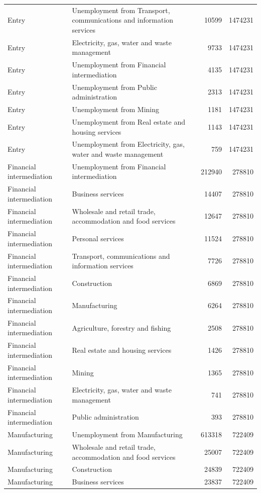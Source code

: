 \begin{longtable}{llrr}
Entry & Unemployment from Transport, communications and information services & 10599 & 1474231 \\
Entry & Electricity, gas, water and waste management & 9733 & 1474231 \\
Entry & Unemployment from Financial intermediation & 4135 & 1474231 \\
Entry & Unemployment from Public administration & 2313 & 1474231 \\
Entry & Unemployment from Mining & 1181 & 1474231 \\
Entry & Unemployment from Real estate and housing services & 1143 & 1474231 \\
Entry & Unemployment from Electricity, gas, water and waste management & 759 & 1474231 \\
Financial intermediation & Unemployment from Financial intermediation & 212940 & 278810 \\
Financial intermediation & Business services & 14407 & 278810 \\
Financial intermediation & Wholesale and retail trade, accommodation and food services & 12647 & 278810 \\
Financial intermediation & Personal services & 11524 & 278810 \\
Financial intermediation & Transport, communications and information services & 7726 & 278810 \\
Financial intermediation & Construction & 6869 & 278810 \\
Financial intermediation & Manufacturing & 6264 & 278810 \\
Financial intermediation & Agriculture, forestry and fishing & 2508 & 278810 \\
Financial intermediation & Real estate and housing services & 1426 & 278810 \\
Financial intermediation & Mining & 1365 & 278810 \\
Financial intermediation & Electricity, gas, water and waste management & 741 & 278810 \\
Financial intermediation & Public administration & 393 & 278810 \\
Manufacturing & Unemployment from Manufacturing & 613318 & 722409 \\
Manufacturing & Wholesale and retail trade, accommodation and food services & 25007 & 722409 \\
Manufacturing & Construction & 24839 & 722409 \\
Manufacturing & Business services & 23837 & 722409 \\

\end{longtable}
